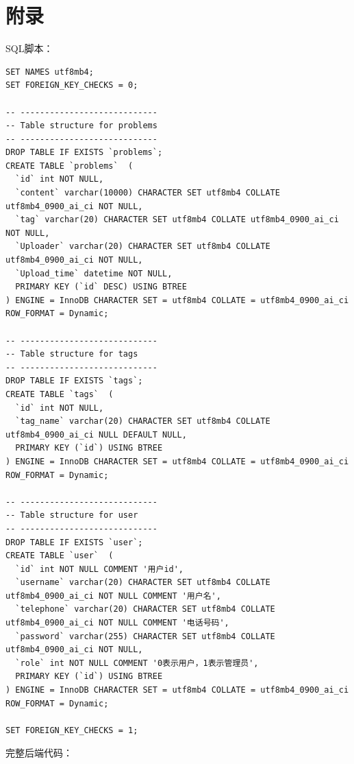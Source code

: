 \documentclass[a4paper,AutoFakeBold={2.7}]{ctexart} %
\begin{document}
\section*{附录}

SQL脚本：
\begin{lstlisting}
SET NAMES utf8mb4;
SET FOREIGN_KEY_CHECKS = 0;

-- ----------------------------
-- Table structure for problems
-- ----------------------------
DROP TABLE IF EXISTS `problems`;
CREATE TABLE `problems`  (
  `id` int NOT NULL,
  `content` varchar(10000) CHARACTER SET utf8mb4 COLLATE utf8mb4_0900_ai_ci NOT NULL,
  `tag` varchar(20) CHARACTER SET utf8mb4 COLLATE utf8mb4_0900_ai_ci NOT NULL,
  `Uploader` varchar(20) CHARACTER SET utf8mb4 COLLATE utf8mb4_0900_ai_ci NOT NULL,
  `Upload_time` datetime NOT NULL,
  PRIMARY KEY (`id` DESC) USING BTREE
) ENGINE = InnoDB CHARACTER SET = utf8mb4 COLLATE = utf8mb4_0900_ai_ci ROW_FORMAT = Dynamic;

-- ----------------------------
-- Table structure for tags
-- ----------------------------
DROP TABLE IF EXISTS `tags`;
CREATE TABLE `tags`  (
  `id` int NOT NULL,
  `tag_name` varchar(20) CHARACTER SET utf8mb4 COLLATE utf8mb4_0900_ai_ci NULL DEFAULT NULL,
  PRIMARY KEY (`id`) USING BTREE
) ENGINE = InnoDB CHARACTER SET = utf8mb4 COLLATE = utf8mb4_0900_ai_ci ROW_FORMAT = Dynamic;

-- ----------------------------
-- Table structure for user
-- ----------------------------
DROP TABLE IF EXISTS `user`;
CREATE TABLE `user`  (
  `id` int NOT NULL COMMENT '用户id',
  `username` varchar(20) CHARACTER SET utf8mb4 COLLATE utf8mb4_0900_ai_ci NOT NULL COMMENT '用户名',
  `telephone` varchar(20) CHARACTER SET utf8mb4 COLLATE utf8mb4_0900_ai_ci NOT NULL COMMENT '电话号码',
  `password` varchar(255) CHARACTER SET utf8mb4 COLLATE utf8mb4_0900_ai_ci NOT NULL,
  `role` int NOT NULL COMMENT '0表示用户，1表示管理员',
  PRIMARY KEY (`id`) USING BTREE
) ENGINE = InnoDB CHARACTER SET = utf8mb4 COLLATE = utf8mb4_0900_ai_ci ROW_FORMAT = Dynamic;

SET FOREIGN_KEY_CHECKS = 1;
\end{lstlisting}

完整后端代码：
\end{document}
